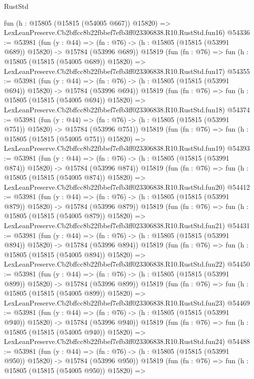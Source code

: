 \begin{lexlean}{RustStd}
\begin{coremodule}
    fun (h : @15805 (@15815 (@54005 @667)) @15820) =>
    LexLeanPreserve.Cb2bffcc8b22fbbef7efb3ff023306838.R10.RustStd.fun16)
@54336 := @53981
    (fun (y : @44) =>
    (fn : @76) -> (h : @15805 (@15815 (@53991 @689)) @15820) -> @15784 (@53996 @689))
    @15819
    (fun (fn : @76) =>
    fun (h : @15805 (@15815 (@54005 @689)) @15820) =>
    LexLeanPreserve.Cb2bffcc8b22fbbef7efb3ff023306838.R10.RustStd.fun17)
@54355 := @53981
    (fun (y : @44) =>
    (fn : @76) -> (h : @15805 (@15815 (@53991 @694)) @15820) -> @15784 (@53996 @694))
    @15819
    (fun (fn : @76) =>
    fun (h : @15805 (@15815 (@54005 @694)) @15820) =>
    LexLeanPreserve.Cb2bffcc8b22fbbef7efb3ff023306838.R10.RustStd.fun18)
@54374 := @53981
    (fun (y : @44) =>
    (fn : @76) -> (h : @15805 (@15815 (@53991 @751)) @15820) -> @15784 (@53996 @751))
    @15819
    (fun (fn : @76) =>
    fun (h : @15805 (@15815 (@54005 @751)) @15820) =>
    LexLeanPreserve.Cb2bffcc8b22fbbef7efb3ff023306838.R10.RustStd.fun19)
@54393 := @53981
    (fun (y : @44) =>
    (fn : @76) -> (h : @15805 (@15815 (@53991 @874)) @15820) -> @15784 (@53996 @874))
    @15819
    (fun (fn : @76) =>
    fun (h : @15805 (@15815 (@54005 @874)) @15820) =>
    LexLeanPreserve.Cb2bffcc8b22fbbef7efb3ff023306838.R10.RustStd.fun20)
@54412 := @53981
    (fun (y : @44) =>
    (fn : @76) -> (h : @15805 (@15815 (@53991 @879)) @15820) -> @15784 (@53996 @879))
    @15819
    (fun (fn : @76) =>
    fun (h : @15805 (@15815 (@54005 @879)) @15820) =>
    LexLeanPreserve.Cb2bffcc8b22fbbef7efb3ff023306838.R10.RustStd.fun21)
@54431 := @53981
    (fun (y : @44) =>
    (fn : @76) -> (h : @15805 (@15815 (@53991 @894)) @15820) -> @15784 (@53996 @894))
    @15819
    (fun (fn : @76) =>
    fun (h : @15805 (@15815 (@54005 @894)) @15820) =>
    LexLeanPreserve.Cb2bffcc8b22fbbef7efb3ff023306838.R10.RustStd.fun22)
@54450 := @53981
    (fun (y : @44) =>
    (fn : @76) -> (h : @15805 (@15815 (@53991 @899)) @15820) -> @15784 (@53996 @899))
    @15819
    (fun (fn : @76) =>
    fun (h : @15805 (@15815 (@54005 @899)) @15820) =>
    LexLeanPreserve.Cb2bffcc8b22fbbef7efb3ff023306838.R10.RustStd.fun23)
@54469 := @53981
    (fun (y : @44) =>
    (fn : @76) -> (h : @15805 (@15815 (@53991 @940)) @15820) -> @15784 (@53996 @940))
    @15819
    (fun (fn : @76) =>
    fun (h : @15805 (@15815 (@54005 @940)) @15820) =>
    LexLeanPreserve.Cb2bffcc8b22fbbef7efb3ff023306838.R10.RustStd.fun24)
@54488 := @53981
    (fun (y : @44) =>
    (fn : @76) -> (h : @15805 (@15815 (@53991 @950)) @15820) -> @15784 (@53996 @950))
    @15819
    (fun (fn : @76) =>
    fun (h : @15805 (@15815 (@54005 @950)) @15820) =>

\end{coremodule}
\end{lexlean}
